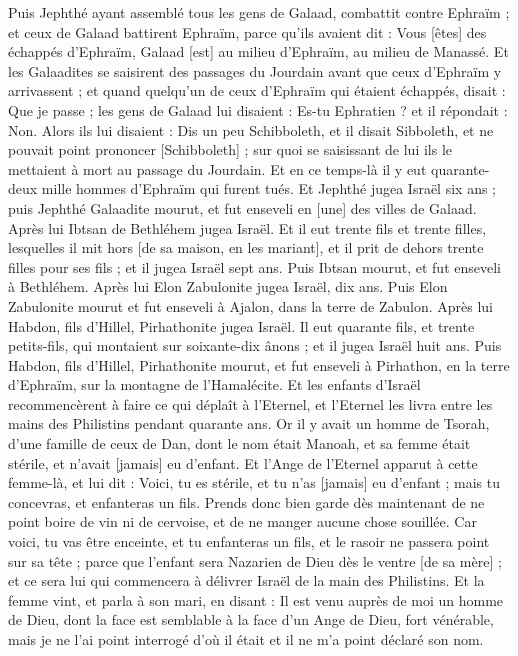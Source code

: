 \begin{multicols}{2}
Puis Jephthé ayant assemblé tous les gens de Galaad, combattit contre Ephraïm ; et ceux de Galaad battirent Ephraïm, parce qu'ils avaient dit : Vous [êtes] des échappés d'Ephraïm, Galaad [est] au milieu d'Ephraïm, au milieu de Manassé.
Et les Galaadites se saisirent des passages du Jourdain avant que ceux d'Ephraïm y arrivassent ; et quand quelqu'un de ceux d'Ephraïm qui étaient échappés, disait : Que je passe ; les gens de Galaad lui disaient : Es-tu Ephratien ? et il répondait : Non.
Alors ils lui disaient : Dis un peu Schibboleth, et il disait Sibboleth, et ne pouvait point prononcer [Schibboleth] ; sur quoi se saisissant de lui ils le mettaient à mort au passage du Jourdain. Et en ce temps-là il y eut quarante-deux mille hommes d'Ephraïm qui furent tués.
Et Jephthé jugea Israël six ans ; puis Jephthé Galaadite mourut, et fut enseveli en [une] des villes de Galaad.
Après lui Ibtsan de Bethléhem jugea Israël.
Et il eut trente fils et trente filles, lesquelles il mit hors [de sa maison, en les mariant], et il prit de dehors trente filles pour ses fils ; et il jugea Israël sept ans.
Puis Ibtsan mourut, et fut enseveli à Bethléhem.
Après lui Elon Zabulonite jugea Israël, dix ans.
Puis Elon Zabulonite mourut et fut enseveli à Ajalon, dans la terre de Zabulon.
Après lui Habdon, fils d'Hillel, Pirhathonite jugea Israël.
Il eut quarante fils, et trente petits-fils, qui montaient sur soixante-dix ânons ; et il jugea Israël huit ans.
Puis Habdon, fils d'Hillel, Pirhathonite mourut, et fut enseveli à Pirhathon, en la terre d'Ephraïm, sur la montagne de l'Hamalécite.
\VerseOne{}Et les enfants d'Israël recommencèrent à faire ce qui déplaît à l'Eternel, et l'Eternel les livra entre les mains des Philistins pendant quarante ans.
Or il y avait un homme de Tsorah, d'une famille de ceux de Dan, dont le nom était Manoah, et sa femme était stérile, et n'avait [jamais] eu d'enfant.
Et l'Ange de l'Eternel apparut à cette femme-là, et lui dit : Voici, tu es stérile, et tu n'as [jamais] eu d'enfant ; mais tu concevras, et enfanteras un fils.
Prends donc bien garde dès maintenant de ne point boire de vin ni de cervoise, et de ne manger aucune chose souillée.
Car voici, tu vas être enceinte, et tu enfanteras un fils, et le rasoir ne passera point sur sa tête ; parce que l'enfant sera Nazarien de Dieu dès le ventre [de sa mère] ; et ce sera lui qui commencera à délivrer Israël de la main des Philistins.
Et la femme vint, et parla à son mari, en disant : Il est venu auprès de moi un homme de Dieu, dont la face est semblable à la face d'un Ange de Dieu, fort vénérable, mais je ne l'ai point interrogé d'où il était et il ne m'a point déclaré son nom.

\end{multicols}
